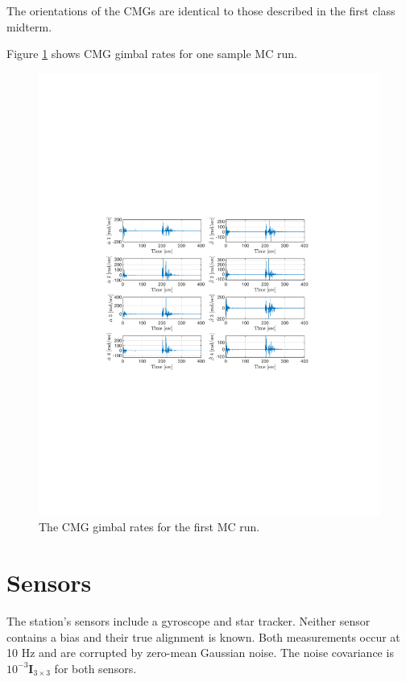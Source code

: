\documentclass[]{article}
\begin{document}
The orientations of the CMGs are identical to those described in the first class midterm.

Figure \ref{fig:CMG_rates_1} shows CMG gimbal rates for one sample MC run.
\begin{figure}[!h]
	\centering
	\includegraphics[width=\linewidth,trim={4cm, 8cm, 4cm, 8cm},clip]{figs/CMG_rates_1.pdf}
	\caption{The CMG gimbal rates for the first MC run.}
	\label{fig:CMG_rates_1}
\end{figure}

\section{Sensors}

The station's sensors include a gyroscope and star tracker. Neither sensor contains a bias and their true alignment is known. Both measurements occur at 10 Hz and are corrupted by zero-mean Gaussian noise. The noise covariance is $10^{-3}\bm{I}_{3 \times 3}$ for both sensors.
\end{document}
